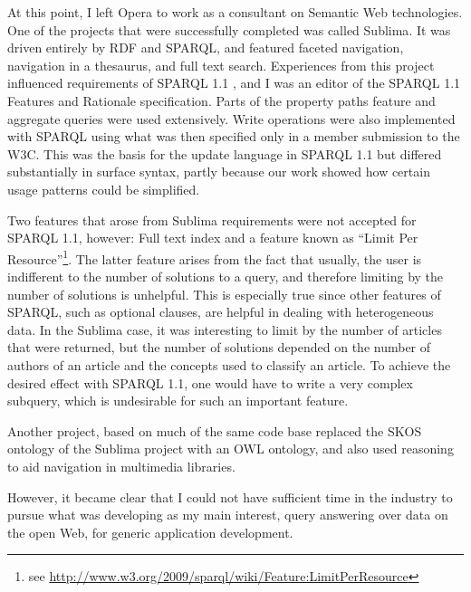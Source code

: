 At this point, I left Opera to work as a consultant on Semantic Web
technologies. One of the projects that were successfully completed was
called Sublima\cite{sublima}. It was driven entirely by RDF and SPARQL,
and featured faceted navigation, navigation in a thesaurus, and full
text search. Experiences from this project influenced requirements of
SPARQL 1.1 \cite{sparql11query}, and I was an editor of the SPARQL 1.1 Features and
Rationale specification\cite{sparql11new}. Parts of the property paths
feature and aggregate queries were used extensively. Write operations
were also implemented with SPARQL using what was then specified only
in a member submission to the W3C\cite{seaborne2008sparql}. This was the basis for
the update language in SPARQL 1.1 but differed substantially in
surface syntax, partly because our work showed how certain usage patterns
could be simplified. 

Two features that arose from Sublima requirements were not accepted
for SPARQL 1.1, however: Full text index and a feature known as
``Limit Per Resource''\footnote{see
  \url{http://www.w3.org/2009/sparql/wiki/Feature:LimitPerResource}}. The
latter feature arises from the fact that usually, the user is
indifferent to the number of solutions to a query, and therefore
limiting by the number of solutions is unhelpful. This is especially
true since other features of SPARQL, such as optional clauses, are
helpful in dealing with heterogeneous data. In the Sublima case, it
was interesting to limit by the number of articles that were returned,
but the number of solutions depended on the number of authors of an
article and the concepts used to classify an article. To achieve the
desired effect with SPARQL 1.1, one would have to write a very complex
subquery, which is undesirable for such an important feature.


Another project, based on much of the same code
base replaced the SKOS ontology of the Sublima project with an OWL
ontology, and also used reasoning to aid navigation in multimedia
libraries.



However, it became clear that I could not have sufficient time in the
industry to pursue what was developing as my main interest, query
answering over data on the open Web, for generic application
development. 
